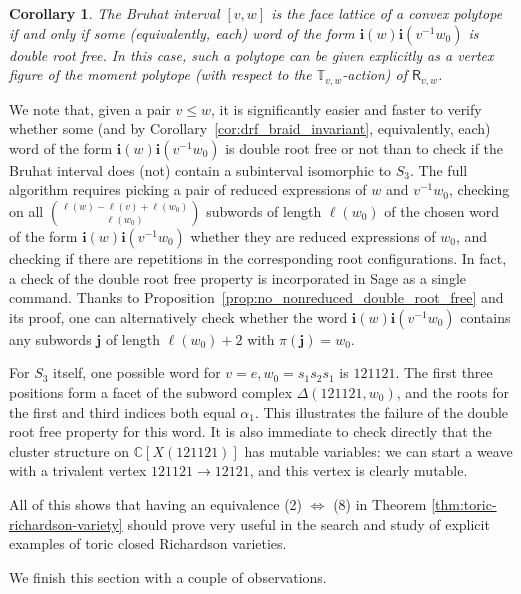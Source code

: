\documentclass[a4paper, 11pt]{amsart}
\newcommand{\rich}[1]{\mathsf{R}_{#1}}
\newcommand{\word}[1]{\mathbf{#1}}
\newcommand{\C}{\mathbb{C}}
\newcommand{\dil}[1]{\mathbb{T}_{#1}}
\newtheorem{corollary}[theorem]{Corollary}%
\theoremstyle{definition}
\begin{document}
\begin{corollary}
The Bruhat interval $[v,w]$ is the face lattice of a convex polytope if and only if some (equivalently, each) word of the form $\word{i}(w)\word{i}(v^{-1}w_0)$ is double root free. In this case, such a polytope can be given explicitly as a vertex figure of the moment polytope (with respect to the $\dil{v,w}$-action) of $\rich{v,w}$.
\end{corollary}


We note that, given a pair $v \leq w$, it is significantly easier and faster to verify whether some (and by Corollary~\ref{cor:drf_braid_invariant}, equivalently, each) word of the form $\word{i}(w)\word{i}(v^{-1}w_0)$ is double root free or not than to check if the Bruhat interval does (not) contain a subinterval isomorphic to $S_3$. The full algorithm requires picking a pair of reduced expressions of $w$ and $v^{-1}w_0$, checking on all $\binom{\ell(w) - \ell(v) + \ell(w_0)}{\ell(w_0)}$ subwords of length $\ell(w_0)$ of the chosen word of the form $\word{i}(w)\word{i}(v^{-1}w_0)$ whether they are reduced expressions of $w_0$, and checking if there are repetitions in the corresponding root configurations.
In fact, a check of the double root free property is incorporated in Sage as a single command. Thanks to Proposition~\ref{prop:no_nonreduced_double_root_free} and its proof, one can alternatively check whether the word $\word{i}(w)\word{i}(v^{-1}w_0)$ contains any subwords $\word{j}$ of length $\ell(w_0) +2$ with $\pi(\word{j}) = w_0$. 

For $S_3$ itself, one possible word for $v = e, w_0 = s_1 s_2 s_1$ is $121121$. The first three positions form a facet of the subword complex $\Delta(121121, w_0)$, and the roots for the first and third indices both equal $\alpha_1$. This illustrates the failure of the double root free property for this word. It is also immediate to check directly that the cluster structure on $\C[X(121121)]$ has mutable variables: we can start a weave with a trivalent vertex $121121 \to 12121$, and this vertex is clearly mutable.

All of this shows that having an equivalence (2) $\Longleftrightarrow$ (8) in Theorem \ref{thm:toric-richardson-variety} should prove very useful in the search and study of explicit examples of toric closed Richardson varieties.

\bigskip

We finish this section with a couple of observations.
\end{document}

